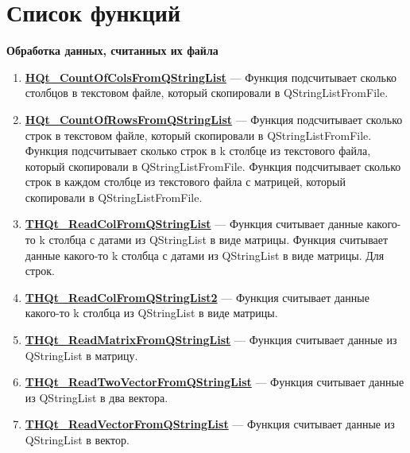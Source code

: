 \documentclass[a4paper,12pt]{article}
\begin{document}
\section{Список функций}\label{section_listfunctions}
\textbf{Обработка данных, считанных их файла}
\begin{enumerate}

\item \textbf{\hyperref[HQt_CountOfColsFromQStringList]{HQt\_CountOfColsFromQStringList}} --- Функция подсчитывает сколько столбцов в текстовом файле, который скопировали в QStringListFromFile.

\item \textbf{\hyperref[HQt_CountOfRowsFromQStringList]{HQt\_CountOfRowsFromQStringList}} --- Функция подсчитывает сколько строк в текстовом файле, который скопировали в QStringListFromFile. Функция подсчитывает сколько строк в k столбце из текстового файла, который скопировали в QStringListFromFile. Функция подсчитывает сколько строк в каждом столбце из текстового файла с матрицей, который скопировали в QStringListFromFile.

\item \textbf{\hyperref[THQt_ReadColFromQStringList]{THQt\_ReadColFromQStringList}} --- Функция считывает данные какого-то k столбца с датами из QStringList в виде матрицы. Функция считывает данные какого-то k столбца с датами из QStringList в виде матрицы. Для строк.

\item \textbf{\hyperref[THQt_ReadColFromQStringList2]{THQt\_ReadColFromQStringList2}} --- Функция считывает данные какого-то k столбца из QStringList в виде матрицы.

\item \textbf{\hyperref[THQt_ReadMatrixFromQStringList]{THQt\_ReadMatrixFromQStringList}} --- Функция считывает данные из QStringList в матрицу.

\item \textbf{\hyperref[THQt_ReadTwoVectorFromQStringList]{THQt\_ReadTwoVectorFromQStringList}} --- Функция считывает данные из QStringList в два вектора.

\item \textbf{\hyperref[THQt_ReadVectorFromQStringList]{THQt\_ReadVectorFromQStringList}} --- Функция считывает данные из QStringList в вектор.

\end{enumerate}
\end{document}
